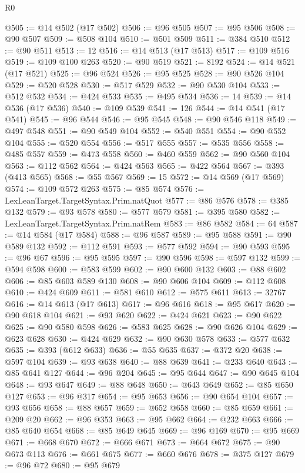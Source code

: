 \begin{lexlean}{R0}
\begin{coremodule}
@505 := @14 @502 (@17 @502)
@506 := @96 @505
@507 := @95 @506
@508 := @90 @507
@509 := @508 @104
@510 := @501 @509
@511 := @384 @510
@512 := @90 @511
@513 := 12
@516 := @14 @513 (@17 @513)
@517 := @109 @516
@519 := @109 @100 @263
@520 := @90 @519
@521 := 8192
@524 := @14 @521 (@17 @521)
@525 := @96 @524
@526 := @95 @525
@528 := @90 @526 @104
@529 := @520 @528
@530 := @517 @529
@532 := @90 @530 @104
@533 := @512 @532
@534 := @424 @533
@535 := @495 @534
@536 := 14
@539 := @14 @536 (@17 @536)
@540 := @109 @539
@541 := 126
@544 := @14 @541 (@17 @541)
@545 := @96 @544
@546 := @95 @545
@548 := @90 @546 @118
@549 := @497 @548
@551 := @90 @549 @104
@552 := @540 @551
@554 := @90 @552 @104
@555 := @520 @554
@556 := @517 @555
@557 := @535 @556
@558 := @485 @557
@559 := @473 @558
@560 := @460 @559
@562 := @90 @560 @104
@563 := @112 @562
@564 := @424 @563
@565 := @422 @564
@567 := @393 (@413 @565)
@568 := @55 @567
@569 := 15
@572 := @14 @569 (@17 @569)
@574 := @109 @572 @263
@575 := @85 @574
@576 := LexLeanTarget.TargetSyntax.Prim.natQuot
@577 := @86 @576
@578 := @385 @132
@579 := @93 @578
@580 := @577 @579
@581 := @395 @580
@582 := LexLeanTarget.TargetSyntax.Prim.natRem
@583 := @86 @582
@584 := 64
@587 := @14 @584 (@17 @584)
@588 := @96 @587
@589 := @95 @588
@591 := @90 @589 @132
@592 := @112 @591
@593 := @577 @592
@594 := @90 @593
@595 := @96 @67
@596 := @95 @595
@597 := @90 @596
@598 := @597 @132
@599 := @594 @598
@600 := @583 @599
@602 := @90 @600 @132
@603 := @88 @602
@606 := @85 @603 @589 @130
@608 := @90 @606 @104
@609 := @112 @608
@610 := @424 @609
@611 := @581 @610
@612 := @575 @611
@613 := 32767
@616 := @14 @613 (@17 @613)
@617 := @96 @616
@618 := @95 @617
@620 := @90 @618 @104
@621 := @93 @620
@622 := @424 @621
@623 := @90 @622
@625 := @90 @580 @598
@626 := @583 @625
@628 := @90 @626 @104
@629 := @623 @628
@630 := @424 @629
@632 := @90 @630 @578
@633 := @577 @632
@635 := @393 (@612 @633)
@636 := @55 @635
@637 := @372 @20
@638 := @597 @104
@639 := @93 @638
@640 := @88 @639
@641 := @233 @640
@643 := @85 @641 @127
@644 := @96 @204
@645 := @95 @644
@647 := @90 @645 @104
@648 := @93 @647
@649 := @88 @648
@650 := @643 @649
@652 := @85 @650 @127
@653 := @96 @317
@654 := @95 @653
@656 := @90 @654 @104
@657 := @93 @656
@658 := @88 @657
@659 := @652 @658
@660 := @85 @659
@661 := @209 @20
@662 := @96 @353
@663 := @95 @662
@664 := @232 @663
@666 := @85 @640 @654
@668 := @85 @649 @645
@669 := @96 @169
@670 := @95 @669
@671 := @668 @670
@672 := @666 @671
@673 := @664 @672
@675 := @90 @673 @113
@676 := @661 @675
@677 := @660 @676
@678 := @375 @127
@679 := @96 @72
@680 := @95 @679

\end{coremodule}
\end{lexlean}
